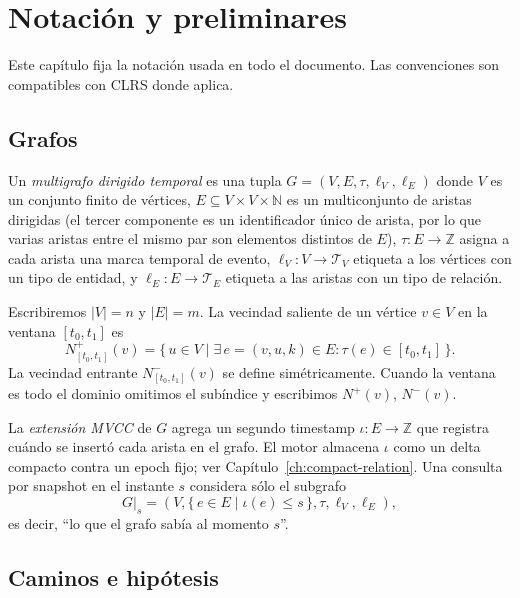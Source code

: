 \chapter{Notación y preliminares}
\label{ch:notation}

Este capítulo fija la notación usada en todo el documento. Las
convenciones son compatibles con CLRS donde aplica.

\section{Grafos}

\begin{definition}
Un \emph{multigrafo dirigido temporal} es una tupla $G = (V, E,
\tau, \ell_V, \ell_E)$ donde $V$ es un conjunto finito de
vértices, $E \subseteq V \times V \times \mathbb{N}$ es un
multiconjunto de aristas dirigidas (el tercer componente es un
identificador único de arista, por lo que varias aristas entre el
mismo par son elementos distintos de $E$), $\tau : E \to
\mathbb{Z}$ asigna a cada arista una marca temporal de evento,
$\ell_V : V \to \mathcal{T}_V$ etiqueta a los vértices con un tipo
de entidad, y $\ell_E : E \to \mathcal{T}_E$ etiqueta a las
aristas con un tipo de relación.
\end{definition}

Escribiremos $|V| = n$ y $|E| = m$. La vecindad saliente de un
vértice $v \in V$ en la ventana $[t_0, t_1]$ es
\[
    N^{+}_{[t_0, t_1]}(v) = \{\, u \in V \mid \exists\, e = (v, u,
    k) \in E : \tau(e) \in [t_0, t_1]\,\}.
\]
La vecindad entrante $N^{-}_{[t_0, t_1]}(v)$ se define
simétricamente. Cuando la ventana es todo el dominio omitimos el
subíndice y escribimos $N^{+}(v)$, $N^{-}(v)$.

\begin{definition}
La \emph{extensión MVCC} de $G$ agrega un segundo timestamp
$\iota : E \to \mathbb{Z}$ que registra cuándo se insertó cada
arista en el grafo. El motor almacena $\iota$ como un delta
compacto contra un epoch fijo; ver
Capítulo~\ref{ch:compact-relation}. Una consulta por snapshot en
el instante $s$ considera sólo el subgrafo
\[
    G|_{s} = (V, \{\,e \in E \mid \iota(e) \leq s\,\}, \tau, \ell_V,
    \ell_E),
\]
es decir, ``lo que el grafo sabía al momento $s$''.
\end{definition}

\section{Caminos e hipótesis}

